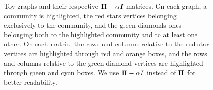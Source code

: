 \begin{figure}[t]
    \hfill
    \hfill
    \caption[Toy graphs and their respective $\mat{\Pi} - \alpha \identity{n}$ matrices]{Toy graphs and their respective $\mat{\Pi} - \alpha \identity{n}$ matrices. On each graph, a community is highlighted, the red stars vertices belonging exclusively to the community, and the green diamonds ones belonging both to the highlighted community and to at least one other. On each matrix, the rows and columns relative to the red star vertices are highlighted through red and orange boxes, and the rows and columns relative to the green diamond vertices are highlighted through green and cyan boxes.  We use $\mat{\Pi} - \alpha \identity{n}$ instead of $\boldsymbol{\Pi}$ for better readability.}
    \label{fig:graphs_PPR}
\end{figure}

